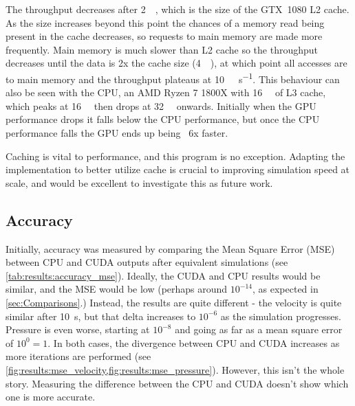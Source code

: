 The throughput decreases after \SI{2}{\mega\byte}, which is the size of the GTX~1080 L2 cache\cite{nvidia1080Whitepaper}.
As the size increases beyond this point the chances of a memory read being present in the cache decreases, so requests to main memory are made more frequently.
Main memory is much slower than L2 cache so the throughput decreases until the data is 2x the cache size (\SI{4}{\mega\byte}), at which point all accesses are to main memory and the throughput plateaus at \SI{10}{\giga\op\per\second}.
This behaviour can also be seen with the CPU, an AMD Ryzen 7 1800X with \SI{16}{\mega\byte} of L3 cache, which peaks at \SI{16}{\mega\byte} then drops at \SI{32}{\mega\byte} onwards.
Initially when the GPU performance drops it falls below the CPU performance, but once the CPU performance falls the GPU ends up being ~6x faster.

Caching is vital to performance, and this program is no exception.
Adapting the implementation to better utilize cache is crucial to improving simulation speed at scale, and would be excellent to investigate this as future work.

\subsection{Accuracy}\label{sec:Results:Sim:Accuracy}



Initially, accuracy was measured by comparing the Mean Square Error (MSE) between CPU and CUDA outputs after equivalent simulations (see \cref{tab:results:accuracy_mse}).
Ideally, the CUDA and CPU results would be similar, and the MSE would be low (perhaps around $10^{-14}$, as expected in \cref{sec:Comparisons}.)
Instead, the results are quite different - the velocity is quite similar after \SI{10}{\second}, but that delta increases to $10^{-6}$ as the simulation progresses.
Pressure is even worse, starting at $10^{-8}$ and going as far as a mean square error of $10^{0} = 1$.
In both cases, the divergence between CPU and CUDA increases as more iterations are performed (see \cref{fig:results:mse_velocity,fig:results:mse_pressure}).
However, this isn't the whole story.
Measuring the difference between the CPU and CUDA doesn't show which one is more accurate.

